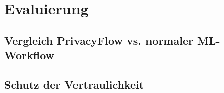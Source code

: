 \chapter{Evaluierung}
\section{Vergleich PrivacyFlow vs. normaler ML-Workflow}
\section{Schutz der Vertraulichkeit}